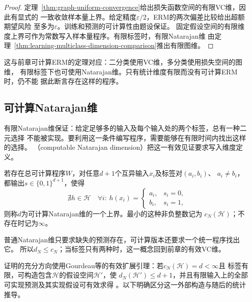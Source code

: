 \begin{proof}
定理~\ref{thm:graph-uniform-convergence}给出损失函数空间的有限VC维，因此有显式的
一致收敛样本量上界。给定精度$\varepsilon/2$，ERM的两次偏差比较给出超额期望风险
至多为$\varepsilon$。训练和预测的可计算性由题设保证。
固定假设空间的有限维度上界可作为常数写入样本量程序。有限标签时，有限Natarajan维
由定理~\ref{thm:learning-multiclass-dimension-comparison}推出有限图维。
\end{proof}

这与前章可计算ERM的定理对应：二分类使用VC维，多分类使用损失空间的图维，
有限标签下也可使用Natarajan维。只有统计维度有限而没有可计算ERM时，仍不能
据此断言存在这样的程序。

\subsection{可计算Natarajan维}

有限Natarajan维保证：给定足够多的输入及每个输入处的两个标签，总有一种二元选择
不能被实现。要利用这一条件编写程序，需要能够在有限时间内找出这样的选择。
（computable Natarajan dimension）把这一有效见证要求写入维度定义。

\begin{definition}[可计算Natarajan维]
\label{def:computable-natarajan-dimension}
若存在总可计算程序$W$，对任意$d+1$个互异输入$x_i$及标签对$(a_i,b_i)$、
$a_i\neq b_i$，都输出$s\in\{0,1\}^{d+1}$，使得
\[
 \nexists h\in\mathcal H\quad
 \forall i:\ h(x_i)=\begin{cases}a_i,&s_i=0,\\b_i,&s_i=1,\end{cases}
\]
则称$d$为可计算Natarajan维的一个上界。最小的这种非负整数记为
$c_N(\mathcal H)$；不存在时记为$\infty$。
\end{definition}

普通Natarajan维只要求缺失的预测存在，可计算版本还要求一个统一程序找出它。
所以$d_N\leq c_N$；当标签只有两种时，这一概念回到前章的有效VC维。

证明的充分方向使用Gourdeau等的有效扩展引理：若$c_N(\mathcal H)=d<\infty$且
标签有限，可构造包含$\mathcal H$的假设空间$\mathcal H'$，使
$d_N(\mathcal H')\leq d+1$，并且有限输入上的全部可实现预测及其实现假设可有效求得
。以下明确区分这一外部构造与随后的统计推导。

